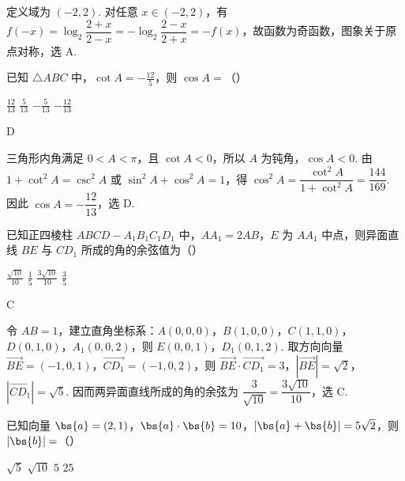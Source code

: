 \begin{solution}
定义域为 \((-2,2)\). 对任意 \(x\in(-2,2)\)，有 \(f(-x)=\log_2\dfrac{2+x}{2-x}=-\log_2\dfrac{2-x}{2+x}=-f(x)\)，故函数为奇函数，图象关于原点对称，选 A.
\end{solution}

\begin{problem}
已知 \(\triangle ABC\) 中，\(\cot A = -\frac{12}{5}\)，则 \(\cos A =\)（\quad）

\choices
    {\(\frac{12}{13}\)}
    {\(\frac{5}{13}\)}
    {\(-\frac{5}{13}\)}
    {\(-\frac{12}{13}\)}
\end{problem}

\begin{answer}
D
\end{answer}

\begin{solution}
三角形内角满足 \(0<A<\pi\)，且 \(\cot A<0\)，所以 \(A\) 为钝角，\(\cos A<0\). 由 \(1+\cot^2A=\csc^2A\) 或 \(\sin^2A+\cos^2A=1\)，得
\(\cos^2A=\dfrac{\cot^2A}{1+\cot^2A}=\dfrac{144}{169}\). 因此 \(\cos A=-\dfrac{12}{13}\)，选 D.
\end{solution}

\begin{problem}
已知正四棱柱 \(ABCD - A_{1}B_{1}C_{1}D_{1}\) 中，\(AA_{1} = 2AB\)，\(E\) 为 \(AA_{1}\) 中点，则异面直线 \(BE\) 与 \(CD_{1}\) 所成的角的余弦值为（\quad）

\choices
    {\(\frac{\sqrt{10}}{10}\)}
    {\(\frac{1}{5}\)}
    {\(\frac{3\sqrt{10}}{10}\)}
    {\(\frac{3}{5}\)}
\end{problem}

\begin{answer}
C
\end{answer}

\begin{solution}
令 \(AB=1\)，建立直角坐标系：\(A(0,0,0)\)，\(B(1,0,0)\)，\(C(1,1,0)\)，\(D(0,1,0)\)，\(A_1(0,0,2)\)，则 \(E(0,0,1)\)，\(D_1(0,1,2)\). 取方向向量 \(\overrightarrow{BE}=(-1,0,1)\)，\(\overrightarrow{CD_1}=(-1,0,2)\)，则
\(\overrightarrow{BE}\cdot\overrightarrow{CD_1}=3\)，\(|\overrightarrow{BE}|=\sqrt2\)，\(|\overrightarrow{CD_1}|=\sqrt5\). 因而两异面直线所成的角的余弦为 \(\dfrac{3}{\sqrt{10}}=\dfrac{3\sqrt{10}}{10}\)，选 C.
\end{solution}

\begin{problem}
已知向量 \(\bs{a} = (2,1)\)，\(\bs{a} \cdot \bs{b} = 10\)，\(|\bs{a} + \bs{b}| = 5\sqrt{2}\)，则 \(|\bs{b}| =\)（\quad）

\choices
    {\(\sqrt{5}\)}
    {\(\sqrt{10}\)}
    {\(5\)}
    {\(25\)}
\end{problem}

